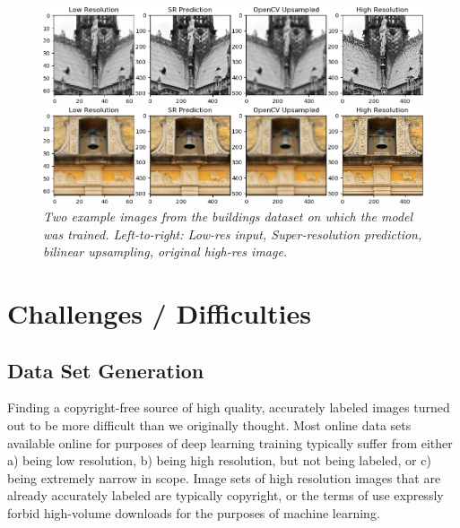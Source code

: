 \documentclass{article}
\begin{document}
\begin{figure}[h!]
\includegraphics[width=\textwidth]{midterm_results/test_img_6.png}
\par\medskip
\includegraphics[width=\textwidth]{midterm_results/test_img_11.png}
\caption{\textit{Two example images from the buildings dataset on which the model was trained. Left-to-right: Low-res input, Super-resolution prediction, bilinear upsampling, original high-res image.}} \label{fig:building_examples}
\end{figure}

\section{Challenges / Difficulties}
\subsection{Data Set Generation}
Finding a copyright-free source of high quality, accurately labeled images turned out to be more difficult than we originally thought. Most online data sets available online for purposes of deep learning training typically suffer from either a) being low resolution, b) being high resolution, but not being labeled, or c) being extremely narrow in scope. Image sets of high resolution images that are already accurately labeled are typically copyright, or the terms of use expressly forbid high-volume downloads for the purposes of machine learning.  
\end{document}
